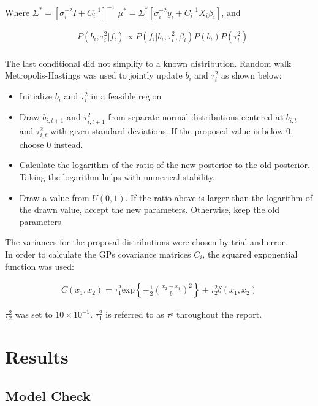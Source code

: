 \documentclass[paper=a4, fontsize=11pt]{scrartcl}
\begin{document}
Where  $\Sigma^*=[\sigma_i^{-2}I + C_i^{-1}]^{-1} $ $\mu^*=\Sigma^*[\sigma_i^{-2}y_i + C_i^{-1}X_i\beta_i]$, and

\begin{align*}
     & P(b_i,\tau_i^2 | f_i)  \propto P(f_i|b_i, \tau_i^2, \beta_i)P(b_i)P(\tau_i^2) \\
\end{align*}

The last conditional  did not simplify to a known distribution. Random walk Metropolis-Hastings was used to jointly update $b_i$ and $\tau_i^2$ as shown below:

\begin{itemize}
    \item Initialize $b_i$ and $\tau_i^2$ in a feasible region
    \item Draw $b_{i, t+1}$ and $\tau^2_{i, t+1}$ from separate normal distributions centered at  $b_{i, t}$ and $\tau^2_{i, t}$ with given standard deviations. If the proposed value is below 0, choose 0 instead. 
    \item Calculate the logarithm of the ratio of the 
    new posterior to the old posterior. Taking the logarithm helps with numerical stability.
    \item Draw a value from $U(0,1)$. If the ratio above is larger than the logarithm of the drawn value, accept the new parameters. Otherwise, keep the old parameters.
\end{itemize}

The variances for the proposal distributions were chosen by trial and error.\\


In order to calculate the GPs covariance matrices $C_i$, the squared exponential function was used:

\begin{align*}
    C(x_1, x_2) = \tau_1^2 \mbox{exp} \left\{-\frac{1}{2} \left( \frac{x_2 - x_1}{b}\right)^2 \right\} + \tau_2^2  \delta(x_1, x_2)
\end{align*}

$\tau^2_2$ was set to $10 \times 10^{-5}$. $\tau^2_1$ is referred to as $\tau^_2$ throughout the report.

\section{Results}

\subsection{Model Check}
\end{document}
